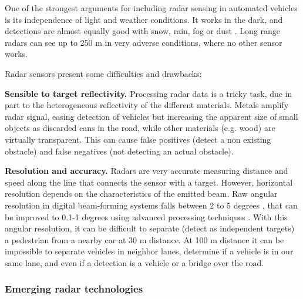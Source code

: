 \documentclass[journal]{IEEEtran}
\begin{document}

One of the strongest arguments for including radar sensing in automated 
vehicles is its independence of light and weather conditions. 
It works in the dark, and detections are almost equally good with snow, 
rain, fog or dust \cite{Reina2015}. Long range radars can see up to 250 m
in very adverse conditions, where no other sensor works.

Radar sensors present some difficulties and drawbacks:

\textbf{Sensible to target reflectivity.} Processing radar data is a tricky
task, due in part to the heterogeneous reflectivity of the different 
materials. 
Metals amplify radar signal, easing detection of vehicles but increasing
the apparent size of small objects as discarded cans in the road, while 
other materials (e.g. wood) are virtually transparent.
This can cause false positives (detect a non existing obstacle) and false
negatives (not detecting an actual obstacle).

\textbf{Resolution and accuracy.} Radars are very accurate measuring 
distance
and speed along the line that connects the sensor with a target. However, 
horizontal resolution depends on the characteristics of the emitted beam.
Raw angular resolution in digital beam-forming systems falls between 2 to 5
degrees \cite{Schneider2005}, that can be improved to 0.1-1 degrees using 
advanced processing techniques \cite{Kissinger2012}. 
With this angular resolution, it can be difficult to separate (detect as
independent targets) a pedestrian from a nearby car at 30 m distance. 
At 100 m distance it can be impossible to separate vehicles in neighbor
lanes, determine if a vehicle is in our same lane, and even if a detection
is a vehicle or a bridge over the road.

\subsubsection{Emerging radar technologies}
\end{document}
